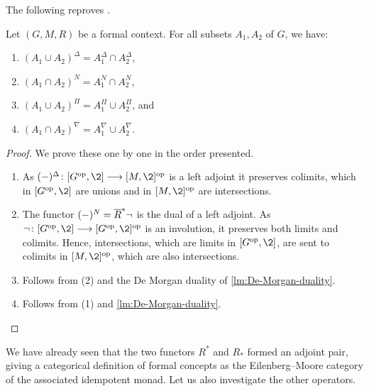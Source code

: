 The following reproves \cite[5.1]{dubois-dupin-prade_2007}. 

\begin{proposition}
    Let $(G,M,R)$ be a formal context. For all subsets $A_1, A_2$ of $G$, we have: 
    \begin{enumerate}
        \item $(A_1\cup A_2)^\Delta = A_1^\Delta \cap A_2^\Delta$,
        \item $(A_1\cap A_2)^N = A_1^N \cap A_2^N$,
        \item $(A_1\cup A_2)^\Pi = A_1^\Pi \cup A_2^\Pi$, and
        \item $(A_1\cap A_2)^\nabla = A_1^\nabla \cup A_2^\nabla$.
    \end{enumerate}
\end{proposition}
\begin{proof}
    We prove these one by one in the order presented. 
    \begin{enumerate}
        \item As $(-)^\Delta\: [G\op, \2]\to [M,\2]\op$ is a left adjoint it preserves colimits, which in $[G\op,\2]$ are unions and in $[M,\2]\op$ are intersections. 
        \item The functor $(-)^N = \overline{R}^*\neg$ is the dual of a left adjoint. As $\neg\: [G\op, \2]\to [G\op, \2]\op$ is an involution, it preserves both limits and colimits. Hence, intersections, which are limits in $[G\op, \2]$, are sent to colimits in $[M,\2]\op$, which are also intersections.
        \item Follows from (2) and the De Morgan duality of \cref{lm:De-Morgan-duality}.
        \item Follows from (1) and \cref{lm:De-Morgan-duality}. \qedhere
    \end{enumerate}
\end{proof}

We have already seen that the two functors $R^*$ and $R_*$ formed an adjoint pair, giving a categorical definition of formal concepts as the Eilenberg--Moore category of the associated idempotent monad. Let us also investigate the other operators. 

